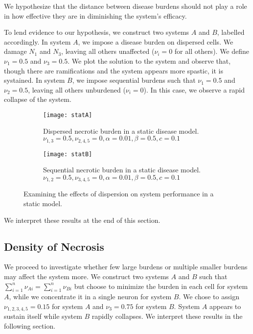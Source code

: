 \documentclass[11pt]{report}
\begin{document}
We hypothesize that the distance between disease burdens should not play a role in how effective they are in diminishing the system's efficacy. 

To lend evidence to our hypothesis, we construct two systems $A$ and $B$, labelled accordingly. In system $A$, we impose a disease burden on dispersed cells. We damage $N_1$ and $N_3$, leaving all others unaffected ($\nu_i = 0$ for all others). We define $\nu_1 = 0.5$ and $\nu_3 = 0.5$. We plot the solution to the system and observe that, though there are ramifications and the system appears more spastic, it is systained. In system $B$, we impose sequential burdens such that $\nu_1 = 0.5$ and $\nu_2 = 0.5$, leaving all others unburdened ($\nu_i = 0$). In this case, we observe a rapid collapse of the system. 


\begin{figure}
    \centering
    \begin{subfigure}[b]{0.48\textwidth}
        \texttt{[image: statA]}
        \caption{Dispersed necrotic burden in a static disease model. $\nu_{1,3} = 0.5, \nu_{2,4,5} = 0, \alpha = 0.01, \beta = 0.5,c = 0.1$}
        \label{fig:statA}
    \end{subfigure}
    \hfill %
    \begin{subfigure}[b]{0.48\textwidth}
        \texttt{[image: statB]}
        \caption{Sequential necrotic burden in a static disease model. $\nu_{1,2} = 0.5, \nu_{3,4,5} = 0, \alpha = 0.01, \beta = 0.5,c = 0.1$}
        \label{fig:statB}
    \end{subfigure}
    \caption{Examining the effects of dispersion on system performance in a static model. }\label{fig:dispersion}
\end{figure}


We interpret these results at the end of this section. 

\subsection{Density of Necrosis} %
\label{sub:density_of_necrosis}



We proceed to investigate whether few large burdens or multiple smaller burdens may affect the system more. We construct two systems $A$ and $B$ such that $\sum^n_{i=1} \nu_{Ai} = \sum^n_{i=1} \nu_{Bi}$ but choose to minimize the burden in each cell for system $A$, while we concentrate it in a single neuron for system $B$. We chose to assign $\nu_{1,2,3,4,5}= 0.15$ for system $A$ and $\nu_3 = 0.75$ for system $B$. System $A$ appears to sustain itself while system $B$ rapidly collapses. We interpret these results in the following section.
\end{document}
